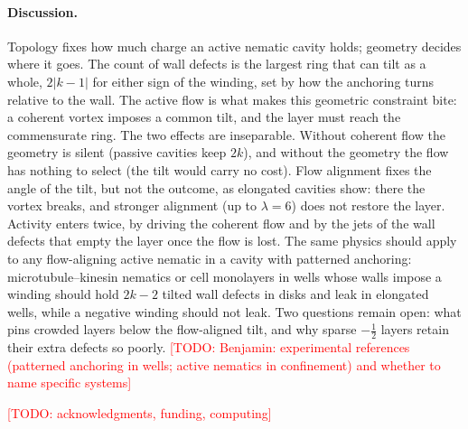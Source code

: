 \documentclass[aps,prl,twocolumn,superscriptaddress,amsmath,amssymb,reprint]{revtex4-2}
\newcommand{\half}{\tfrac12}
\newcommand{\todo}[1]{\textcolor{red}{[TODO: #1]}}
\begin{document}
\paragraph*{Discussion.} Topology fixes how much charge an active nematic cavity holds; geometry decides where it goes. The count of wall defects is the largest ring that can
tilt as a whole, $2|k-1|$ for either sign of the winding, set by how the anchoring turns relative to the wall. The active flow is what makes this geometric constraint
bite: a coherent vortex imposes a common tilt, and the layer must reach the commensurate ring. The two effects are inseparable. Without coherent flow the geometry is
silent (passive cavities keep $2k$), and without the geometry the flow has nothing to select (the tilt would carry no cost). Flow alignment fixes the angle of the tilt,
but not the outcome, as elongated cavities show: there the vortex breaks, and stronger alignment (up to $\lambda=6$) does not restore the layer. Activity enters twice, by driving the
coherent flow and by the jets of the wall defects that empty the layer once the flow is lost. The same physics should apply to any flow-aligning active nematic in a
cavity with patterned anchoring: microtubule--kinesin nematics or cell monolayers in wells whose walls impose a winding should hold $2k-2$ tilted wall defects in disks
and leak in elongated wells, while a negative winding should not leak. Two questions remain open: what pins crowded layers below the flow-aligned tilt, and why sparse
$-\half$ layers retain their extra defects so poorly.
\todo{Benjamin: experimental references (patterned anchoring in wells; active nematics in confinement) and whether to name specific systems}

\begin{acknowledgments}
\todo{acknowledgments, funding, computing}
\end{acknowledgments}


\end{document}
